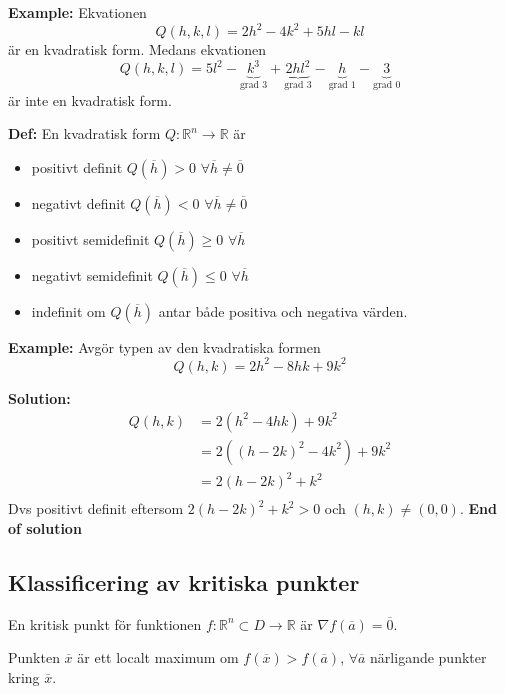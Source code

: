 \textbf{Example:} 
Ekvationen
\begin{equation*}
    Q(h,k,l) = 2h^2 -4k^2 +5hl -kl
\end{equation*}
är en kvadratisk form.
Medans ekvationen
\begin{equation*}
    Q(h,k,l) = 5l^2 -\underbrace{k^3}_{\text{grad 3}} +\underbrace{2hl^2}_{\text{grad 3}} -\underbrace{h}_{\text{grad 1}} -\underbrace{3}_{\text{grad 0}}
\end{equation*}
är inte en kvadratisk form.

\textbf{Def:}
En kvadratisk form $Q:\mathbb{R}^n\to\mathbb{R}$ är
\begin{itemize}
    \item positivt definit $Q(\overline{h})>0$ $\forall\overline{h}\neq\overline{0}$
    \item negativt definit $Q(\overline{h})<0$ $\forall\overline{h}\neq\overline{0}$
    \item positivt semidefinit $Q(\overline{h})\geq0$ $\forall\overline{h}$
    \item negativt semidefinit $Q(\overline{h})\leq0$ $\forall\overline{h}$
    \item indefinit om $Q(\overline{h})$ antar både positiva och negativa värden.
\end{itemize}

\textbf{Example:} 
Avgör typen av den kvadratiska formen 
\begin{equation*}
    Q(h,k) = 2h^2 -8hk + 9k^2
\end{equation*}

\textbf{Solution:} 
\begin{align*}
    Q(h,k) &= 2(h^2 -4hk) + 9k^2 \\
    &= 2((h-2k)^2 -4k^2) + 9k^2 \\
    &= 2(h-2k)^2 +k^2 \\
\end{align*}
Dvs positivt definit eftersom $2(h-2k)^2 +k^2>0$ och $(h,k)\neq(0,0)$.
\textbf{End of solution} 


\subsection{Klassificering av kritiska punkter}
En kritisk punkt för funktionen $f:\mathbb{R}^n\subset D\to\mathbb{R}$
är $\nabla f(\overline{a})=\overline{0}$.

Punkten $\overline{x}$ är ett localt maximum om $f(\overline{x})>f(\overline{a})$,
$\forall\overline{a}$ närligande punkter kring $\overline{x}$.

